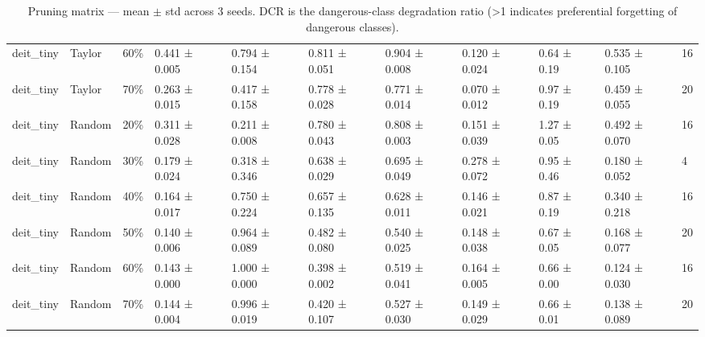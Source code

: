 \begin{table}[t]
\begin{tabular}{lllllllllll}
deit\_tiny & Taylor & 60\% & 0.441 ± 0.005 & 0.794 ± 0.154 & 0.811 ± 0.051 & 0.904 ± 0.008 & 0.120 ± 0.024 & 0.64 ± 0.19 & 0.535 ± 0.105 & 16 \\
deit\_tiny & Taylor & 70\% & 0.263 ± 0.015 & 0.417 ± 0.158 & 0.778 ± 0.028 & 0.771 ± 0.014 & 0.070 ± 0.012 & 0.97 ± 0.19 & 0.459 ± 0.055 & 20 \\
deit\_tiny & Random & 20\% & 0.311 ± 0.028 & 0.211 ± 0.008 & 0.780 ± 0.043 & 0.808 ± 0.003 & 0.151 ± 0.039 & 1.27 ± 0.05 & 0.492 ± 0.070 & 16 \\
deit\_tiny & Random & 30\% & 0.179 ± 0.024 & 0.318 ± 0.346 & 0.638 ± 0.029 & 0.695 ± 0.049 & 0.278 ± 0.072 & 0.95 ± 0.46 & 0.180 ± 0.052 & 4 \\
deit\_tiny & Random & 40\% & 0.164 ± 0.017 & 0.750 ± 0.224 & 0.657 ± 0.135 & 0.628 ± 0.011 & 0.146 ± 0.021 & 0.87 ± 0.19 & 0.340 ± 0.218 & 16 \\
deit\_tiny & Random & 50\% & 0.140 ± 0.006 & 0.964 ± 0.089 & 0.482 ± 0.080 & 0.540 ± 0.025 & 0.148 ± 0.038 & 0.67 ± 0.05 & 0.168 ± 0.077 & 20 \\
deit\_tiny & Random & 60\% & 0.143 ± 0.000 & 1.000 ± 0.000 & 0.398 ± 0.002 & 0.519 ± 0.041 & 0.164 ± 0.005 & 0.66 ± 0.00 & 0.124 ± 0.030 & 16 \\
deit\_tiny & Random & 70\% & 0.144 ± 0.004 & 0.996 ± 0.019 & 0.420 ± 0.107 & 0.527 ± 0.030 & 0.149 ± 0.029 & 0.66 ± 0.01 & 0.138 ± 0.089 & 20 \\
\bottomrule
\end{tabular}
\caption{Pruning matrix — mean $\pm$ std across 3 seeds. DCR is the dangerous-class degradation ratio (>1 indicates preferential forgetting of dangerous classes).}
\label{tab:pruning_headline}
\end{table}